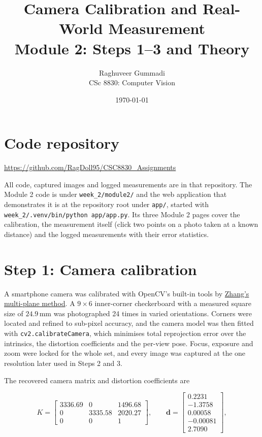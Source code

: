 \documentclass[11pt,a4paper]{article}
\title{Camera Calibration and Real-World Measurement\\
       \large Module 2: Steps 1--3 and Theory}
\author{Raghuveer Gummadi \\ \small CSc 8830: Computer Vision}
\date{\today}
\newcommand{\mm}{\,\mathrm{mm}}
\begin{document}
\maketitle

\section*{Code repository}

\begin{center}
\url{https://github.com/RagDoll95/CSC8830_Assignments}
\end{center}

\noindent
All code, captured images and logged measurements are in that repository. The
Module 2 code is under \texttt{week\_2/module2/} and the web application that
demonstrates it is at the repository root under \texttt{app/}, started with
\texttt{week\_2/.venv/bin/python app/app.py}. Its three Module 2 pages cover
the calibration, the measurement itself (click two points on a photo taken at
a known distance) and the logged measurements with their error statistics.

\section{Step 1: Camera calibration}

A smartphone camera was calibrated with OpenCV's built-in tools by
\href{https://www.microsoft.com/en-us/research/wp-content/uploads/2016/02/tr98-71.pdf}%
{Zhang's multi-plane method}. A $9 \times 6$ inner-corner checkerboard with a measured
square size of $24.9\mm$ was photographed 24 times in varied orientations.
Corners were located and refined to sub-pixel accuracy, and the camera model
was then fitted with \texttt{cv2.calibrateCamera}, which minimises total
reprojection error over the intrinsics, the distortion coefficients and the
per-view pose. Focus, exposure and zoom were locked for the whole set, and
every image was captured at the one resolution later used in Steps 2 and 3.

The recovered camera matrix and distortion coefficients are

\begin{equation}
K =
\begin{bmatrix}
3336.69 & 0 & 1496.68 \\
0 & 3335.58 & 2020.27 \\
0 & 0 & 1
\end{bmatrix},
\qquad
\mathbf{d} =
\begin{bmatrix}
0.2231 \\ -1.3758 \\ 0.00058 \\ -0.00081 \\ 2.7090
\end{bmatrix},
\end{equation}
\end{document}
